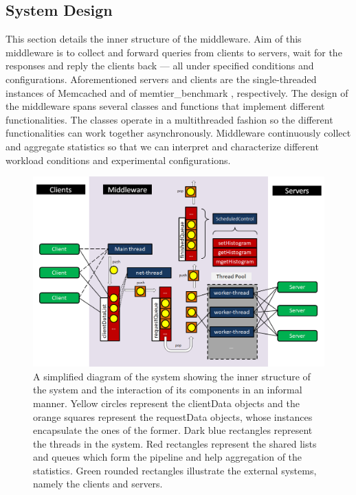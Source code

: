 \documentclass[11pt,a4paper]{article}
\begin{document}
\subsection{System Design} \label{sec:ov-system-design}
This section details the inner structure of the middleware. Aim of this middleware is to collect and forward queries from clients to servers, wait for the responses and reply the clients back — all under specified conditions and configurations. Aforementioned servers and clients are the single-threaded instances of Memcached \cite{memcached} and of memtier\_benchmark \cite{memtier}, respectively. The design of the middleware spans several classes and functions that implement different functionalities. The classes operate in a multithreaded fashion so the different functionalities can work together asynchronously. Middleware continuously collect and aggregate statistics so that we can interpret and characterize different workload conditions and experimental configurations.
\begin{figure}[h]
  \centering
  \includegraphics[width=0.9\linewidth,trim={0px 0px 0px 0px},clip]{img/system-diagram.png}
  \caption{A simplified diagram of the system showing the inner structure of the system and the interaction of its components in an informal manner. Yellow circles represent the clientData objects and the orange squares represent the requestData objects, whose instances encapsulate the ones of the former. Dark blue rectangles represent the threads in the system. Red rectangles represent the shared lists and queues which form the pipeline and help aggregation of the statistics. Green rounded rectangles illustrate the external systems, namely the clients and servers.}
  \label{fig:system-diagram}
\end{figure}
\end{document}
